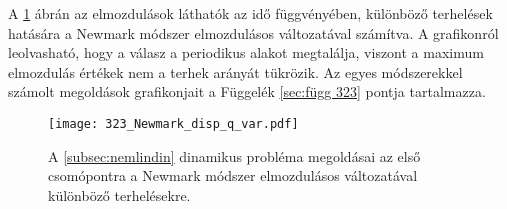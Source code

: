 A \ref{fig:323_newmark_disp_q_var_1} ábrán az elmozdulások láthatók az idő függvényében, különböző terhelések hatására a Newmark módszer elmozdulásos változatával számítva.  A grafikonról leolvasható, hogy a válasz a periodikus alakot megtalálja, viszont a maximum elmozdulás értékek nem a terhek arányát tükrözik. Az egyes módszerekkel számolt megoldások grafikonjait a Függelék \ref{sec:függ 323} pontja tartalmazza. 



\begin{figure}[h!p]
\centering
\texttt{[image: 323\_Newmark\_disp\_q\_var.pdf]}
\caption{A \ref{subsec:nemlindin} dinamikus probléma megoldásai az első csomópontra a Newmark módszer elmozdulásos változatával különböző terhelésekre.}
\label{fig:323_newmark_disp_q_var_1}
\end{figure}
